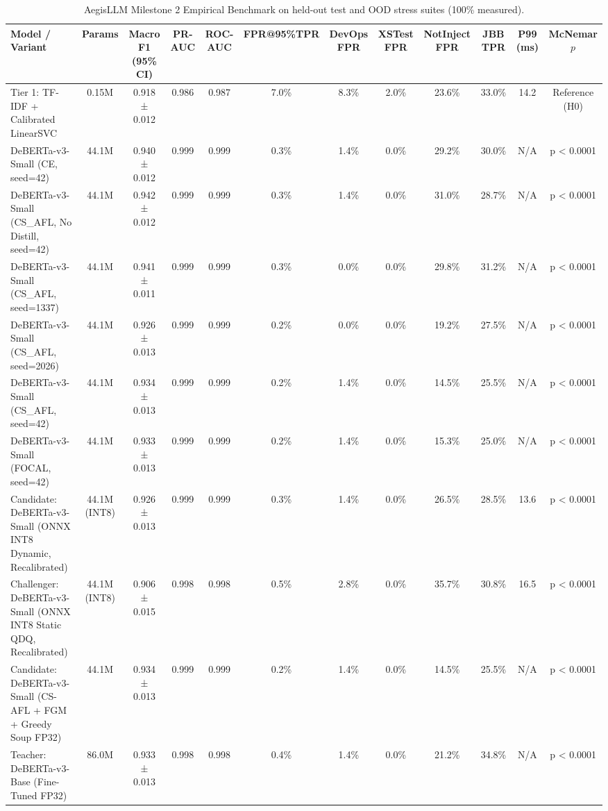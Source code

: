 \begin{table}[t]
\centering
\small
\begin{tabular}{lccccccccccc}
\toprule
\textbf{Model / Variant} & \textbf{Params} & \textbf{Macro F1 (95\% CI)} & \textbf{PR-AUC} & \textbf{ROC-AUC} & \textbf{FPR@95\%TPR} & \textbf{DevOps FPR} & \textbf{XSTest FPR} & \textbf{NotInject FPR} & \textbf{JBB TPR} & \textbf{P99 (ms)} & \textbf{McNemar $p$} \\
\midrule
Tier 1: TF-IDF + Calibrated LinearSVC & 0.15M & 0.918 ± 0.012 & 0.986 & 0.987 & 7.0\% & 8.3\% & 2.0\% & 23.6\% & 33.0\% & 14.2 & Reference (H0) \\
DeBERTa-v3-Small (CE, seed=42) & 44.1M & 0.940 ± 0.012 & 0.999 & 0.999 & 0.3\% & 1.4\% & 0.0\% & 29.2\% & 30.0\% & N/A & p < 0.0001 \\
DeBERTa-v3-Small (CS_AFL, No Distill, seed=42) & 44.1M & 0.942 ± 0.012 & 0.999 & 0.999 & 0.3\% & 1.4\% & 0.0\% & 31.0\% & 28.7\% & N/A & p < 0.0001 \\
DeBERTa-v3-Small (CS_AFL, seed=1337) & 44.1M & 0.941 ± 0.011 & 0.999 & 0.999 & 0.3\% & 0.0\% & 0.0\% & 29.8\% & 31.2\% & N/A & p < 0.0001 \\
DeBERTa-v3-Small (CS_AFL, seed=2026) & 44.1M & 0.926 ± 0.013 & 0.999 & 0.999 & 0.2\% & 0.0\% & 0.0\% & 19.2\% & 27.5\% & N/A & p < 0.0001 \\
DeBERTa-v3-Small (CS_AFL, seed=42) & 44.1M & 0.934 ± 0.013 & 0.999 & 0.999 & 0.2\% & 1.4\% & 0.0\% & 14.5\% & 25.5\% & N/A & p < 0.0001 \\
DeBERTa-v3-Small (FOCAL, seed=42) & 44.1M & 0.933 ± 0.013 & 0.999 & 0.999 & 0.2\% & 1.4\% & 0.0\% & 15.3\% & 25.0\% & N/A & p < 0.0001 \\
Candidate: DeBERTa-v3-Small (ONNX INT8 Dynamic, Recalibrated) & 44.1M (INT8) & 0.926 ± 0.013 & 0.999 & 0.999 & 0.3\% & 1.4\% & 0.0\% & 26.5\% & 28.5\% & 13.6 & p < 0.0001 \\
Challenger: DeBERTa-v3-Small (ONNX INT8 Static QDQ, Recalibrated) & 44.1M (INT8) & 0.906 ± 0.015 & 0.998 & 0.998 & 0.5\% & 2.8\% & 0.0\% & 35.7\% & 30.8\% & 16.5 & p < 0.0001 \\
Candidate: DeBERTa-v3-Small (CS-AFL + FGM + Greedy Soup FP32) & 44.1M & 0.934 ± 0.013 & 0.999 & 0.999 & 0.2\% & 1.4\% & 0.0\% & 14.5\% & 25.5\% & N/A & p < 0.0001 \\
Teacher: DeBERTa-v3-Base (Fine-Tuned FP32) & 86.0M & 0.933 ± 0.013 & 0.998 & 0.998 & 0.4\% & 1.4\% & 0.0\% & 21.2\% & 34.8\% & N/A & p < 0.0001 \\
\bottomrule
\end{tabular}
\caption{AegisLLM Milestone 2 Empirical Benchmark on held-out test and OOD stress suites (100\% measured).}
\label{tab:milestone2_benchmark}
\end{table}
